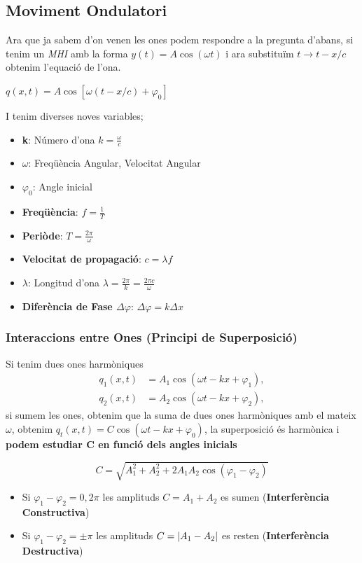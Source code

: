 \documentclass[12pt]{article}
\begin{document}
\subsection{Moviment Ondulatori}

Ara que ja sabem d'on venen les ones podem respondre a la pregunta d'abans, si tenim un \textit{MHI} amb la forma $y(t) = A \cos(\omega t)$ i ara substituïm $t \rightarrow t - x/c$ obtenim l'equació de l'ona.

$q(x,t) = A\cos[\omega(t-x/c) + \varphi_0]$

I tenim diverses noves variables;

\begin{itemize}
    \item \textbf{k}: Número d'ona $k = \frac{\omega}{c}$
    \item \textbf{$\omega$}: Freqüència Angular, Velocitat Angular
    \item \textbf{$\varphi_0$}: Angle inicial
    \item \textbf{Freqüència}: $f = \frac{1}{T}$
    \item \textbf{Periòde}: $T = \frac{2\pi}{\omega}$
    \item \textbf{Velocitat de propagació}: $c = \lambda f$
    \item \textbf{$\lambda$}: Longitud d'ona $\lambda = \frac{2\pi}{k} = \frac{2\pi c}{\omega}$
    \item \textbf{Diferència de Fase $\Delta \varphi$}: $\Delta \varphi = k \Delta x$
\end{itemize}

\subsubsection{Interaccions entre Ones (Principi de Superposició)}

Si tenim dues ones harmòniques
\begin{align*}
    q_1(x,t) &= A_1\cos(\omega t - kx + \varphi_1),\\
    q_2(x,t) &= A_2\cos(\omega t - kx + \varphi_2),
\end{align*}
si sumem les ones, obtenim que la suma de dues ones harmòniques amb el mateix $\omega$, obtenim $q_t(x,t) = C\cos(\omega t -kx + \varphi_0)$, la superposició és harmònica i \textbf{podem estudiar C en funció dels angles inicials}

\[C = \sqrt{A_1^2 + A_2^2 + 2A_1A_2\cos(\varphi_1 - \varphi_2)}\]

\begin{itemize}
    \item Si $\varphi_1 - \varphi_2 = 0, 2\pi$ les amplituds $C = A_1 + A_2$ es sumen (\textbf{Interferència Constructiva})
    \item Si $\varphi_1 - \varphi_2 = \pm \pi$ les amplituds $C = \abs{A_1 - A_2}$ es resten (\textbf{Interferència Destructiva})
\end{itemize}
\end{document}
